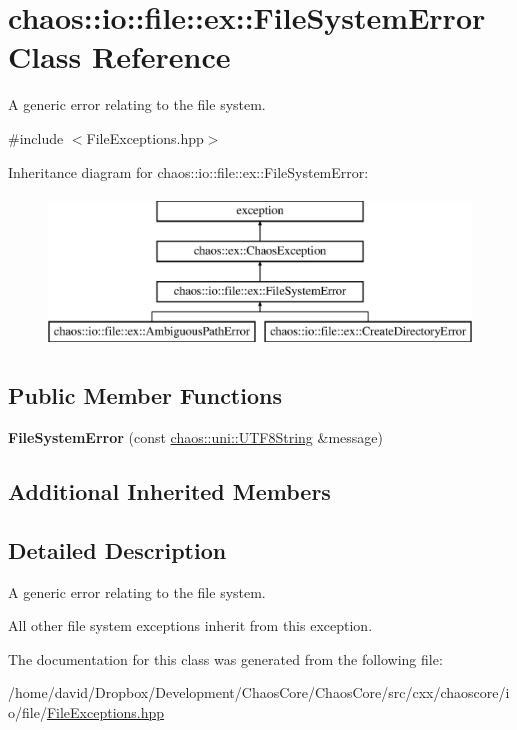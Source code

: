 \hypertarget{classchaos_1_1io_1_1file_1_1ex_1_1_file_system_error}{\section{chaos\-:\-:io\-:\-:file\-:\-:ex\-:\-:File\-System\-Error Class Reference}
\label{classchaos_1_1io_1_1file_1_1ex_1_1_file_system_error}
}


A generic error relating to the file system.  




{\ttfamily \#include $<$File\-Exceptions.\-hpp$>$}

Inheritance diagram for chaos\-:\-:io\-:\-:file\-:\-:ex\-:\-:File\-System\-Error\-:\begin{figure}[H]
\begin{center}
\leavevmode
\includegraphics[height=4.000000cm]{classchaos_1_1io_1_1file_1_1ex_1_1_file_system_error}
\end{center}
\end{figure}
\subsection*{Public Member Functions}
\begin{DoxyCompactItemize}
\item 
\hypertarget{classchaos_1_1io_1_1file_1_1ex_1_1_file_system_error_a5164efe6e9bdcd5d9aa222514b6e1b4b}{{\bfseries File\-System\-Error} (const \hyperlink{classchaos_1_1uni_1_1_u_t_f8_string}{chaos\-::uni\-::\-U\-T\-F8\-String} \&message)}\label{classchaos_1_1io_1_1file_1_1ex_1_1_file_system_error_a5164efe6e9bdcd5d9aa222514b6e1b4b}

\end{DoxyCompactItemize}
\subsection*{Additional Inherited Members}


\subsection{Detailed Description}
A generic error relating to the file system. 

All other file system exceptions inherit from this exception. 

The documentation for this class was generated from the following file\-:\begin{DoxyCompactItemize}
\item 
/home/david/\-Dropbox/\-Development/\-Chaos\-Core/\-Chaos\-Core/src/cxx/chaoscore/io/file/\hyperlink{_file_exceptions_8hpp}{File\-Exceptions.\-hpp}\end{DoxyCompactItemize}
